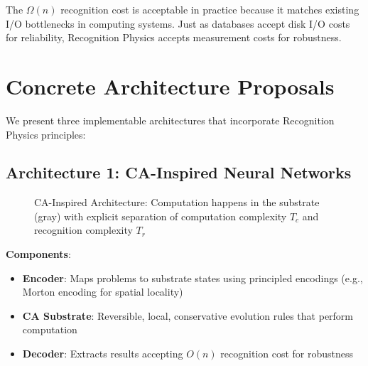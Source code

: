 \documentclass[11pt,letterpaper]{article}
\theoremstyle{plain}
\theoremstyle{definition}
\theoremstyle{remark}
\begin{document}
The $\Omega(n)$ recognition cost is acceptable in practice because it matches existing I/O bottlenecks in computing systems. Just as databases accept disk I/O costs for reliability, Recognition Physics accepts measurement costs for robustness.

\section{Concrete Architecture Proposals}
\label{sec:architectures}

We present three implementable architectures that incorporate Recognition Physics principles:

\subsection{Architecture 1: CA-Inspired Neural Networks}

\begin{figure}[h]
\centering
{}
\caption{CA-Inspired Architecture: Computation happens in the substrate (gray) with explicit separation of computation complexity $T_c$ and recognition complexity $T_r$}
\label{fig:ca-architecture}
\end{figure}

\textbf{Components}:
\begin{itemize}
\item \textbf{Encoder}: Maps problems to substrate states using principled encodings (e.g., Morton encoding for spatial locality)
\item \textbf{CA Substrate}: Reversible, local, conservative evolution rules that perform computation
\item \textbf{Decoder}: Extracts results accepting $O(n)$ recognition cost for robustness
\end{itemize}
\end{document}
